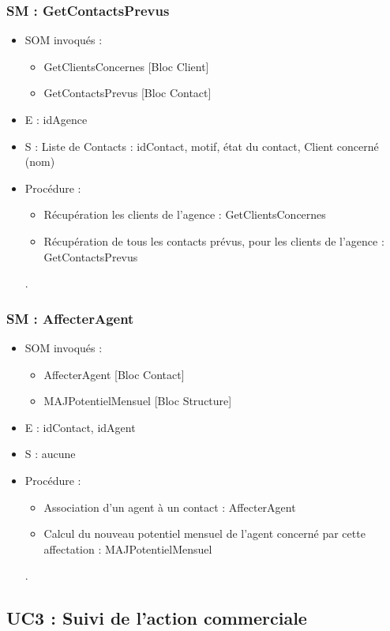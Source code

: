 \subsubsection{SM : GetContactsPrevus}
\begin{itemize}
	\item SOM invoqués : 
	\begin{itemize}
		\item GetClientsConcernes [Bloc Client]
		\item GetContactsPrevus [Bloc Contact]
	\end{itemize}
	\item E : idAgence
	\item S : Liste de Contacts : idContact, motif, état du contact, Client concerné (nom)
	\item Procédure : 
	\begin{itemize}
		\item Récupération les clients de l’agence : GetClientsConcernes 
		\item Récupération de tous les contacts prévus, pour les clients de l’agence : GetContactsPrevus
	\end{itemize}.
\end{itemize}

\subsubsection{SM : AffecterAgent}
\begin{itemize}
	\item SOM invoqués : 
		\begin{itemize}
			\item AffecterAgent [Bloc Contact]
			\item MAJPotentielMensuel [Bloc Structure]
		\end{itemize}
	\item E : idContact, idAgent
	\item S : aucune
	\item Procédure : 
		\begin{itemize}
			\item Association d’un agent à un contact : AffecterAgent
			\item Calcul du nouveau potentiel mensuel de l’agent concerné par cette affectation : MAJPotentielMensuel
		\end{itemize}.
\end{itemize}




\subsection{UC3 : Suivi de l’action commerciale}


